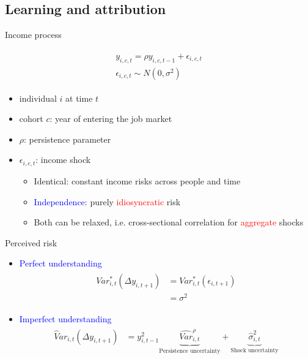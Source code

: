 \documentclass{beamer}
\begin{document}
\subsection{Learning and attribution}

\begin{frame}{Income process}
	
	\begin{eqnarray}
	\begin{split}
	y_{i,c,t} = \rho y_{i,c,t-1} + \epsilon_{i,c,t} \\
	\epsilon_{i,c,t} \sim  N(0,\sigma^2)
	\end{split}
	\end{eqnarray}
	
	\begin{itemize}
		\item individual \(i\) at time
		\(t\) 
		\item cohort $c$: year of entering the job market 
		\item $\rho$: persistence parameter
		\item \(\epsilon_{i,c,t}\): income shock 
		\begin{itemize}
			\item Identical: constant income risks across people and time
			\item \textcolor{blue}{Independence}: purely \textcolor{red}{idiosyncratic} risk 
			\item  Both can be relaxed, i.e. cross-sectional correlation for \textcolor{red}{aggregate} shocks 
		\end{itemize}
	\end{itemize}
\end{frame}


\begin{frame}{Perceived risk}
\begin{itemize}
\item \textcolor{blue}{Perfect understanding}
\begin{eqnarray}
\begin{split}
Var^*_{i,t}(\Delta y_{i,t+1}) & = Var^*_{i,t}(\epsilon_{i,t+1}) \\
& = \sigma^2
\end{split}
\end{eqnarray}
\item \textcolor{blue}{Imperfect understanding} 
\begin{eqnarray}
\begin{split}
\widehat Var_{i,t}(\Delta y_{i,t+1}) & = y_{i,t-1}^2 \underbrace{\widehat{Var}^{\rho}_{i,t}}_{\text{Persistence uncertainty}} + \underbrace{\hat{\sigma}^2_{i,t}}_{\text{Shock uncertainty}}
\end{split}
\end{eqnarray}
\end{itemize}	
\end{frame}
\end{document}
